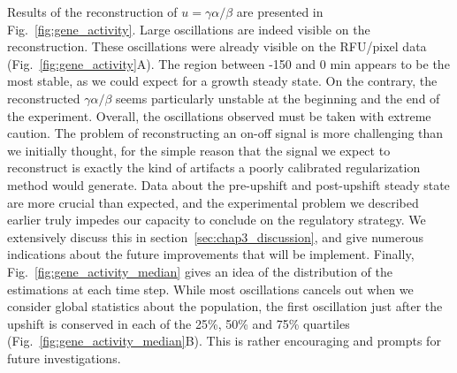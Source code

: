 Results of the reconstruction of $u = \gamma \alpha / \beta$ are presented in Fig.~\ref{fig:gene_activity}.
Large oscillations are indeed visible on the reconstruction.
These oscillations were already visible on the RFU/pixel data (Fig.~\ref{fig:gene_activity}A).
The region between -150 and 0 min appears to be the most stable, as we could expect for a growth steady state.
On the contrary, the reconstructed $\gamma \alpha / \beta$ seems particularly unstable at the beginning and the end of the experiment.
Overall, the oscillations observed must be taken with extreme caution.
The problem of reconstructing an on-off signal is more challenging than we initially thought, for the simple reason that the signal we expect to reconstruct is exactly the kind of artifacts a poorly calibrated regularization method would generate.
Data about the pre-upshift and post-upshift steady state are more crucial than expected, and the experimental problem we described earlier truly impedes our capacity to conclude on the regulatory strategy.
We extensively discuss this in section~\ref{sec:chap3_discussion}, and give numerous indications about the future improvements that will be implement.
Finally, Fig.~\ref{fig:gene_activity_median} gives an idea of the distribution of the estimations at each time step.
While most oscillations cancels out when we consider global statistics about the population, the first oscillation just after the upshift is conserved in each of the 25\%, 50\% and 75\% quartiles (Fig.~\ref{fig:gene_activity_median}B).
This is rather encouraging and prompts for future investigations.

